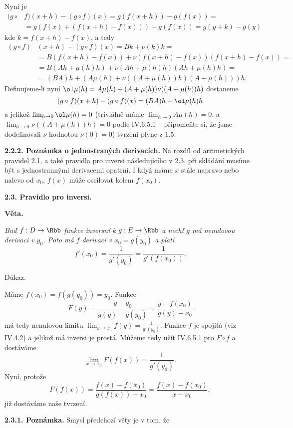 \documentclass[12pt]{article}
\begin{document}
{Nyní je
$$
\begin{aligned}
(g\circ &f)(x+h) -(g\circ f)(x)=g(f(x+h))-g(f(x))=\\
&=g(f(x)+(f(x+h)-f(x)))-g(f(x))= g(y+k)-g(y)
\end{aligned}
$$
kde $k=f(x+h)-f(x)$, a tedy
$$
\begin{aligned}
(g\circ f)&(x+h) -(g\circ f)(x)=Bk+\nu(k)k=\\
&=B(f(x+h)-f(x))+\nu(f(x+h)-f(x))(f(x+h)-f(x))=\\
&=B(Ah+\mu(h)h)+\nu(Ah+\mu(h)h)(Ah+\mu(h)h)=\\
&=(BA)h+(A\mu(h)+\nu((A+\mu(h))h)(A+\mu(h)))h.
\end{aligned}
$$
Definujeme-li nyní $\ol\mu(h)=A\mu(h)+(A+\mu(h))\nu((A+\mu(h))h)$ dostaneme
$$
(g\circ f)(x+h) -(g\circ f)(x)=(BA)h+\ol\mu(h)h
$$
a jelikož $\lim_{h\to 0}\ol\mu(h)=0$ (triviálně máme $\lim_{h\to 0}A\mu(h)=0$, a $\lim_{h\to 0}\nu((A+\mu(h))h)=0$ podle IV.6.5.1 -- připomeňte si, že jsme dodefinovali $\nu$ hodnotou $\nu(0)=0$) tvrzení plyne z 1.5. \sq

\medskip

{\bf 2.2.2. Poznámka o jednostraných derivacích.} Na rozdíl od aritmetických pravidel 2.1, a také pravidla pro inversi následujícího v  2.3, při skládání musíme být s jednostrannými derivacemi opatrní. I  když máme $x$ stále napravo nebo nalevo od  $x_0$, $f(x)$ může oscilovat kolem $f(x_0)$.

\bigskip

{\bf 2.3. Pravidlo pro inversi.}

\smallskip 

{\bf  Věta.} {\em Buď $f:D\to\Rbb$ funkce inversní k $g:E\to\Rbb$ a nechť $g$ má nenulovou derivaci v $y_0$. Poto má $f$ derivaci v $x_0=g(y_0)$ a platí
$$
f'(x_0)=\frac{1}{g'(y_0)}=\frac{1}{g'(f(x_0))}.
$$

Důkaz.} Máme $f(x_0)=f(g(y_0))=y_0$. Funkce
$$
F(y)=\frac{y-y_0}{g(y)-g(y_0)}=\frac{y-f(x_0)}{g(y)-x_0}
$$
má tedy nenulovou limitu $\lim_{y\to y_0}f(y)=\frac{1}{g'(y_0)}$. Funkce  $f$ je spojitá (viz IV.4.2) a jelikož má inversi je prostá. Můžeme tedy užít IV.6.5.1 pro $F\circ f$ a dostáváme
$$ 
\lim_{x\to x_0}F(f(x))=\frac{1}{g'(y_0)}.
$$
Nyní, protože 
$$
F(f(x))=\frac{f(x)-f(x_0)}{g(f(x))-x_0}=\frac{f(x)-f(x_0)}{x-x_0},
$$
již dostáváme naše tvrzení. \sq

\medskip

{\bf 2.3.1. Poznámka.} Smysl předchozí věty je v tom, že

\smallskip

}
\end{document}
